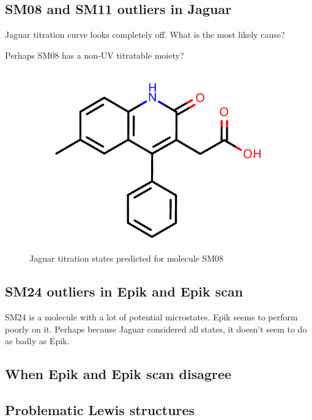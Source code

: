 \documentclass[9pt,lineno,final]{elife}
\begin{document}
\subsection{SM08 and SM11 outliers in Jaguar}

Jaguar titration curve looks completely off. What is the most likely cause?

Perhaps SM08 has a non-UV titratable moiety?

\begin{figure}[H]
    \centering
    \includegraphics{Images/Molecules/SM08.pdf}
    \caption{Jaguar titration states predicted for molecule SM08}
    \label{fig:my_label}
\end{figure}


\subsection{SM24 outliers in Epik and Epik scan}

SM24 is a molecule with a lot of potential microstates. Epik seems to perform poorly on it. Perhaps because Jaguar considered all states, it doesn't seem to do as badly as Epik.

\subsection{When Epik and Epik scan disagree}

\subsection{Problematic Lewis structures}
\end{document}
